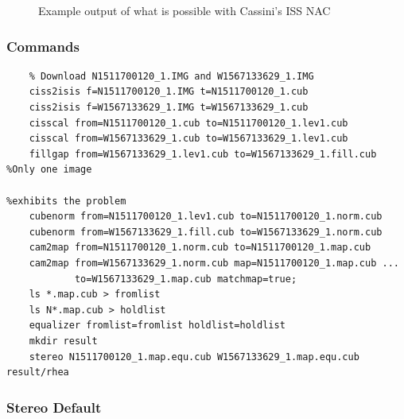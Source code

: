\begin{figure}[p]
  \hfil
\caption{Example output of what is possible with Cassini's ISS NAC}
\label{fig:cassini-exampe}
\end{figure}

\subsubsection*{Commands}

\begin{verbatim}
    % Download N1511700120_1.IMG and W1567133629_1.IMG
    ciss2isis f=N1511700120_1.IMG t=N1511700120_1.cub
    ciss2isis f=W1567133629_1.IMG t=W1567133629_1.cub
    cisscal from=N1511700120_1.cub to=N1511700120_1.lev1.cub
    cisscal from=W1567133629_1.cub to=W1567133629_1.lev1.cub
    fillgap from=W1567133629_1.lev1.cub to=W1567133629_1.fill.cub %Only one image
                                                                  %exhibits the problem
    cubenorm from=N1511700120_1.lev1.cub to=N1511700120_1.norm.cub
    cubenorm from=W1567133629_1.fill.cub to=W1567133629_1.norm.cub
    cam2map from=N1511700120_1.norm.cub to=N1511700120_1.map.cub
    cam2map from=W1567133629_1.norm.cub map=N1511700120_1.map.cub ...
            to=W1567133629_1.map.cub matchmap=true;
    ls *.map.cub > fromlist
    ls N*.map.cub > holdlist
    equalizer fromlist=fromlist holdlist=holdlist
    mkdir result
    stereo N1511700120_1.map.equ.cub W1567133629_1.map.equ.cub result/rhea
\end{verbatim}

\subsubsection*{Stereo Default}

